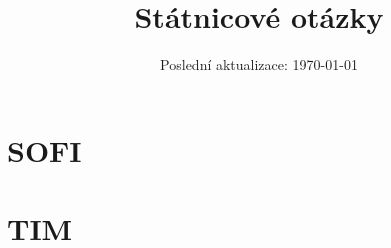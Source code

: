 \documentclass[letterpaper, 12pt]{report}
\newcommand{\1}{\mathds{1}}	%
\theoremstyle{definition}
\begin{document}
\setcounter{tocdepth}{1}


\title{Státnicové otázky \\[1em]}


\date{\normalsize\vspace{-1ex} Poslední aktualizace: \today}


\maketitle
\tableofcontents\label{sec:contents}

\part{SOFI}


\part{TIM}


\end{document}
